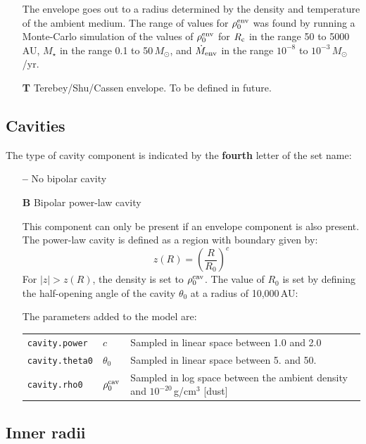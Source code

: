 \documentclass[10pt]{article}
\newcommand{\mdote}{\dot{M}_{\rm env}}
\newcommand{\mstar}{M_\star}
\newcommand{\msun}{M_\odot}
\newcommand{\rc}{R_{\rm c}}
\begin{document}
\begin{itemize}
The envelope goes out to a radius determined by the density and temperature of the ambient medium. The range of values for 
$\rho_0^{\rm env}$ was found by running a Monte-Carlo simulation of the values of $\rho_0^{\rm env}$ for $\rc$ in the range 50 to 5000\,AU, $\mstar$ in the range 0.1 to 50\,$\msun$, and $\mdote$ in the range $10^{-8}$ to $10^{-3}$\,$\msun$/yr.

\item[\textbf{T}] Terebey/Shu/Cassen envelope. To be defined in future.

\end{itemize}

\subsection{Cavities}

The type of cavity component is indicated by the \textbf{fourth} letter of the set name:

\begin{itemize}

\item[\textbf{--}] No bipolar cavity
\item[\textbf{B}] Bipolar power-law cavity

This component can only be present if an envelope component is also present. The power-law cavity is defined as a region with boundary given by:
$$
z(R) = \left(\frac{R}{R_0}\right)^c
$$
For $|z| > z(R)$, the density is set to $\rho_0^{\rm cav}$. The value of $R_0$ is set by defining the half-opening angle of the cavity $\theta_0$ at a radius of 10,000\,AU:

The parameters added to the model are:

\begin{center}
  \begin{tabular}{llp{4in}}
    \texttt{cavity.power} & $c$ & Sampled in linear space between 1.0 and 2.0 \\
    \texttt{cavity.theta0} & $\theta_0$ & Sampled in linear space between 5. and 50. \\
    \texttt{cavity.rho0} & $\rho_0^{\rm cav} $ & Sampled in log space between the ambient density and $10^{-20}$\,g/cm$^3$ [dust]\\
  \end{tabular}
\end{center}

\end{itemize}

\subsection{Inner radii}
\end{document}
